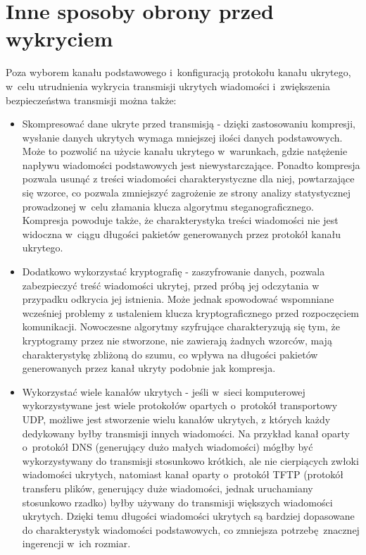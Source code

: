 \documentclass[a4paper, twoside, 12pt]{report}
\begin{document}
    \section{Inne sposoby obrony przed wykryciem}
       Poza wyborem kanału podstawowego i~konfiguracją protokołu kanału ukrytego,
       w~celu utrudnienia wykrycia transmisji ukrytych wiadomości i~zwiększenia
       bezpieczeństwa transmisji można także:
       \begin{itemize}
           \item Skompresować dane ukryte przed transmisją - dzięki zastosowaniu
               kompresji, wysłanie danych ukrytych wymaga mniejszej ilości
               danych podstawowych. Może to pozwolić na użycie kanału ukrytego
               w~warunkach, gdzie natężenie napływu wiadomości podstawowych
               jest niewystarczające. Ponadto kompresja pozwala usunąć z treści
               wiadomości charakterystyczne dla niej, powtarzające się wzorce,
               co pozwala zmniejszyć zagrożenie ze strony analizy statystycznej
               prowadzonej w~celu złamania klucza algorytmu steganograficznego.
               Kompresja powoduje także, że charakterystyka treści wiadomości nie jest widoczna
               w~ciągu długości pakietów generowanych przez protokół kanału ukrytego.
           \item Dodatkowo wykorzystać kryptografię - zaszyfrowanie danych, pozwala
               zabezpieczyć treść wiadomości ukrytej, przed próbą jej odczytania w
               przypadku odkrycia jej istnienia. Może jednak spowodować wspomniane
               wcześniej problemy z ustaleniem klucza kryptograficznego przed rozpoczęciem
               komunikacji. Nowoczesne algorytmy szyfrujące charakteryzują się
               tym, że kryptogramy przez nie stworzone, nie zawierają żadnych wzorców,
               mają charakterystykę zbliżoną do szumu, co wpływa na długości pakietów
               generowanych przez kanał ukryty podobnie jak kompresja.
           \item Wykorzystać wiele kanałów ukrytych - jeśli w~sieci komputerowej
               wykorzystywane jest wiele protokołów opartych o~protokół transportowy UDP,
               możliwe jest stworzenie wielu kanałów ukrytych, z których każdy dedykowany
               byłby transmisji innych wiadomości. Na przykład kanał oparty o~protokół
               DNS (generujący dużo małych wiadomości)  mógłby być wykorzystywany
               do transmisji stosunkowo krótkich, ale nie cierpiących zwłoki wiadomości
               ukrytych, natomiast kanał oparty o~protokół TFTP (protokół transferu plików,
               generujący duże wiadomości, jednak uruchamiany stosunkowo rzadko)
               byłby używany do transmisji większych wiadomości ukrytych. Dzięki
               temu długości wiadomości ukrytych są bardziej dopasowane do charakterystyk
               wiadomości podstawowych, co zmniejsza potrzebę znacznej ingerencji
               w~ich rozmiar.


\end{itemize}
\end{document}

